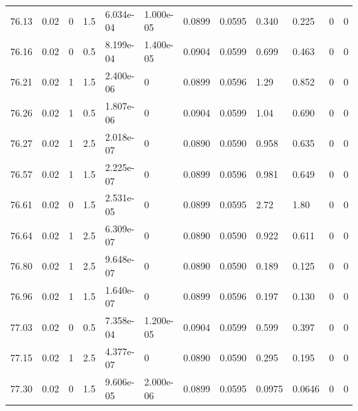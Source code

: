 \documentclass[preview]{standalone}
\begin{document}
{{{{{{{{{{{{{{{\begin{tabular}{L{1.2cm}C{1.2cm} C{0.3cm}C{0.5cm} C{1.4cm}C{1.4cm} C{1.4cm}C{1.4cm} C{1.6cm}C{1.6cm} C{1.6cm}C{1.6cm}}
  76.13  &  0.02  & 0     & 1.5 &  6.034e-04  & 1.000e-05  &  0.0899&   0.0595& 0.340 & 0.225   &  0 & 0  \\ 
  76.16  &  0.02  & 0     & 0.5 &  8.199e-04  & 1.400e-05  &  0.0904&   0.0599& 0.699 & 0.463   &  0 & 0  \\ 
  76.21  &  0.02  & 1     & 1.5 &  2.400e-06  & 0  &  0.0899&   0.0596& 1.29 & 0.852   &  0 & 0  \\ 
  76.26  &  0.02  & 1     & 0.5 &  1.807e-06  & 0  &  0.0904&   0.0599& 1.04 & 0.690   &  0 & 0  \\ 
  76.27  &  0.02  & 1     & 2.5 &  2.018e-07  & 0  &  0.0890&   0.0590& 0.958 & 0.635   &  0 & 0  \\ 
  76.57  &  0.02  & 1     & 1.5 &  2.225e-07  & 0  &  0.0899&   0.0596& 0.981 & 0.649   &  0 & 0  \\ 
  76.61  &  0.02  & 0     & 1.5 &  2.531e-05  & 0  &  0.0899&   0.0595& 2.72 & 1.80   &  0 & 0  \\ 
  76.64  &  0.02  & 1     & 2.5 &  6.309e-07  & 0  &  0.0890&   0.0590& 0.922 & 0.611   &  0 & 0  \\ 
  76.80  &  0.02  & 1     & 2.5 &  9.648e-07  & 0  &  0.0890&   0.0590& 0.189 & 0.125   &  0 & 0  \\ 
  76.96  &  0.02  & 1     & 1.5 &  1.640e-07  & 0  &  0.0899&   0.0596& 0.197 & 0.130   &  0 & 0  \\ 
  77.03  &  0.02  & 0     & 0.5 &  7.358e-04  & 1.200e-05  &  0.0904&   0.0599& 0.599 & 0.397   &  0 & 0  \\ 
  77.15  &  0.02  & 1     & 2.5 &  4.377e-07  & 0  &  0.0890&   0.0590& 0.295 & 0.195   &  0 & 0  \\ 
  77.30  &  0.02  & 0     & 1.5 &  9.606e-05  & 2.000e-06  &  0.0899&   0.0595& 0.0975 & 0.0646   &  0 & 0  \\ 
\hline 
\end{tabular} 

}}}}}}}}}}}}}}}
\end{document}
